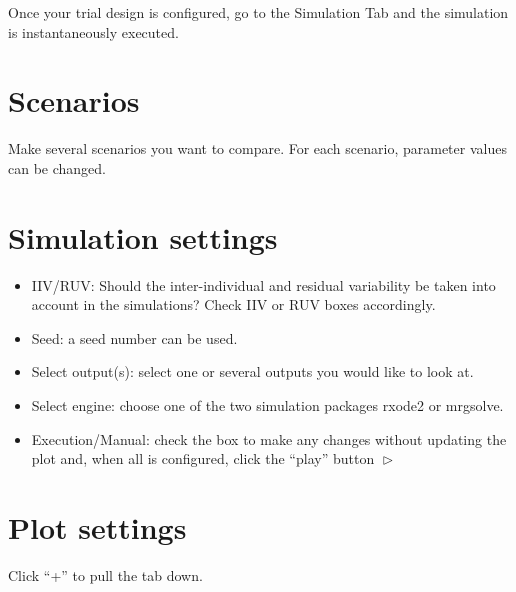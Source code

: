 \documentclass[
]{book}
\providecommand{\tightlist}{%
  \setlength{\itemsep}{0pt}\setlength{\parskip}{0pt}}
\begin{document}
Once your trial design is configured, go to the Simulation Tab and the simulation is instantaneously executed.

\hypertarget{scenarios}{%
\section{Scenarios}\label{scenarios}}

Make several scenarios you want to compare. For each scenario, parameter values can be changed.

\hypertarget{simulation-settings}{%
\section{Simulation settings}\label{simulation-settings}}

\begin{itemize}
\tightlist
\item
  IIV/RUV: Should the inter-individual and residual variability be taken into account in the simulations? Check IIV or RUV boxes accordingly.
\item
  Seed: a seed number can be used.
\item
  Select output(s): select one or several outputs you would like to look at.
\item
  Select engine: choose one of the two simulation packages rxode2 or mrgsolve.
\item
  Execution/Manual: check the box to make any changes without updating the plot and, when all is configured, click the ``play'' button \(\vartriangleright\)
\end{itemize}

\hypertarget{plot-settings}{%
\section{Plot settings}\label{plot-settings}}

Click ``+'' to pull the tab down.
\end{document}
